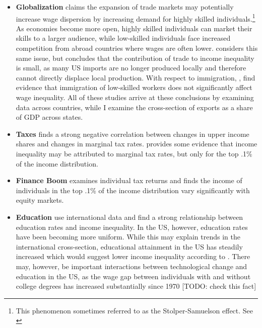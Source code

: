 \documentclass[11pt]{article}
\theoremstyle{definition}
\numberwithin{equation}{section}
\begin{document}
\begin{itemize}
	\begin{itemize}
		\item \cite{berman1998implications}
		\item \cite{kaymak2016evolution}
	\end{itemize}


	
	\item {\bf Globalization} 
	\cite{krugman2008trade} claims the expansion of trade markets may potentially increase wage dispersion by increasing demand for highly skilled individuals.\footnote{This phenomenon sometimes referred to as the Stolper-Samuelson effect. See \cite{stolper1941protection}} As economies become more open, highly skilled individuals can market their skills to a larger audience, while low-skilled individuals face increased competition from abroad countries where wages are often lower. \cite{lawrence2008blue} considers this same issue, but concludes that the contribution of trade to income inequality is small, as many US imports are no longer produced locally and therefore cannot directly displace local production. With respect to immigration, \cite{heckman1998explaining}, find evidence that immigration of low-skilled workers does not significantly affect wage inequality. All of these studies arrive at these conclusions by examining data across countries, while I examine the cross-section of exports as a share of GDP across states. 
		
	\cite{berman1998implications}

	\item {\bf Taxes }
	\cite{alvaredo2013top} finds a strong negative correlation between changes in upper income shares and changes in marginal tax rates. \cite{bakija2012jobs} provides some evidence that income inequality may be attributed to marginal tax rates, but only for the top .1\% of the income distribution. 
	\cite{atkinson2011top}
	\cite{mertens2013marginal}


	\item{\bf Finance Boom }
	\cite{bakija2012jobs} examines individual tax returns and finds the income of individuals in the top .1\% of the income distribution vary significantly with equity markets.

	\item{\bf Education}
	\cite{gregorio2002education} use international data and find a strong relationship between education rates and income inequality. In the US, however, education rates have been becoming more uniform. While this may explain trends in the international cross-section, educational attainment in the US has steadily increased which would suggest lower income inequality according to \cite{gregorio2002education}. There may, however, be important interactions between technological change and education in the US, as the wage gap between individuals with and without college degrees has increased substantially since 1970 [TODO: check this fact]


\end{itemize}
\end{document}
